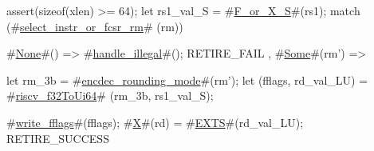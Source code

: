 assert(sizeof(xlen) >= 64);
let rs1_val_S = #\hyperref[sailRISCVzFzyorzyXzyS]{F\_or\_X\_S}#(rs1);
match (#\hyperref[sailRISCVzselectzyinstrzyorzyfcsrzyrm]{select\_instr\_or\_fcsr\_rm}# (rm)) {
  #\hyperref[sailRISCVzNone]{None}#() => { #\hyperref[sailRISCVzhandlezyillegal]{handle\_illegal}#(); RETIRE_FAIL },
  #\hyperref[sailRISCVzSome]{Some}#(rm') => {
    let rm_3b = #\hyperref[sailRISCVzencdeczyroundingzymode]{encdec\_rounding\_mode}#(rm');
    let (fflags, rd_val_LU) = #\hyperref[sailRISCVzriscvzyf32ToUi64]{riscv\_f32ToUi64}# (rm_3b, rs1_val_S);

    #\hyperref[sailRISCVzwritezyfflags]{write\_fflags}#(fflags);
    #\hyperref[sailRISCVzX]{X}#(rd) = #\hyperref[sailRISCVzEXTS]{EXTS}#(rd_val_LU);
    RETIRE_SUCCESS
  }
}

